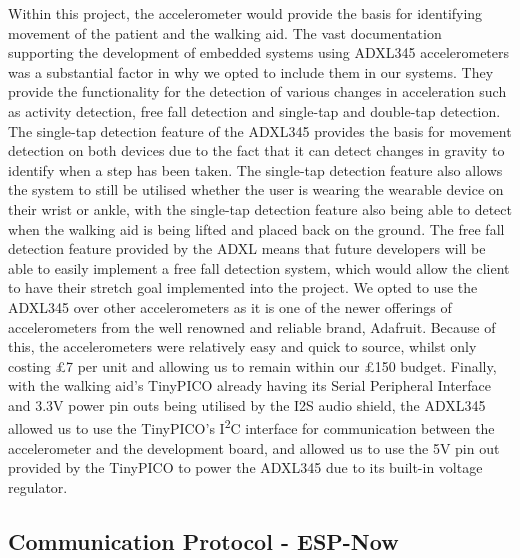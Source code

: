             Within this project, the accelerometer would provide the basis for identifying movement of the patient and the walking aid. The vast documentation supporting the development of embedded systems using ADXL345 accelerometers was a substantial factor in why we opted to include them in our systems. They provide the functionality for the detection of various changes in acceleration such as activity detection, free fall detection and single-tap and double-tap detection. The single-tap detection feature of the ADXL345 provides the basis for movement detection on both devices due to the fact that it can detect changes in gravity to identify when a step has been taken. The single-tap detection feature also allows the system to still be utilised whether the user is wearing the wearable device on their wrist or ankle, with the single-tap detection feature also being able to detect when the walking aid is being lifted and placed back on the ground. The free fall detection feature provided by the ADXL means that future developers will be able to easily implement a free fall detection system, which would allow the client to have their stretch goal implemented into the project. We opted to use the ADXL345 over other accelerometers as it is one of the newer offerings of accelerometers from the well renowned and reliable brand, Adafruit. Because of this, the accelerometers were relatively easy and quick to source, whilst only costing £7 per unit and allowing us to remain within our £150 budget. Finally, with the walking aid's TinyPICO already having its Serial Peripheral Interface and 3.3V power pin outs being utilised by the I2S audio shield, the ADXL345 allowed us to use the TinyPICO's I\textsuperscript{2}C interface for communication between the accelerometer and the development board, and allowed us to use the 5V pin out provided by the TinyPICO to power the ADXL345 due to its built-in voltage regulator.

        \subsection{Communication Protocol - ESP-Now}
        \label{subsec:esp_now_comms}

